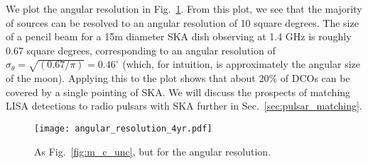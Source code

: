 We plot the angular resolution in Fig.~\ref{fig:ang_res}. From this plot, we see that the majority of sources can be resolved to an angular resolution of 10 square degrees. The size of a pencil beam for a 15m diameter SKA dish observing at 1.4 GHz is roughly 0.67 square degrees, corresponding to an angular resolution of $\sigma_\theta = \sqrt{(0.67 / \pi)} = 0.46^\circ$ (which, for intuition, is approximately the angular size of the moon). Applying this to the plot shows that about 20\% of DCOs can be covered by a single pointing of SKA. We will discuss the prospects of matching LISA detections to radio pulsars with SKA further in Sec.~\ref{sec:pulsar_matching}.

\begin{figure}[ht]
    \centering
    \texttt{[image: angular\_resolution\_4yr.pdf]}
    \caption{As Fig.~\ref{fig:m_c_unc}, but for the angular resolution.}
    \label{fig:ang_res}
\end{figure}
